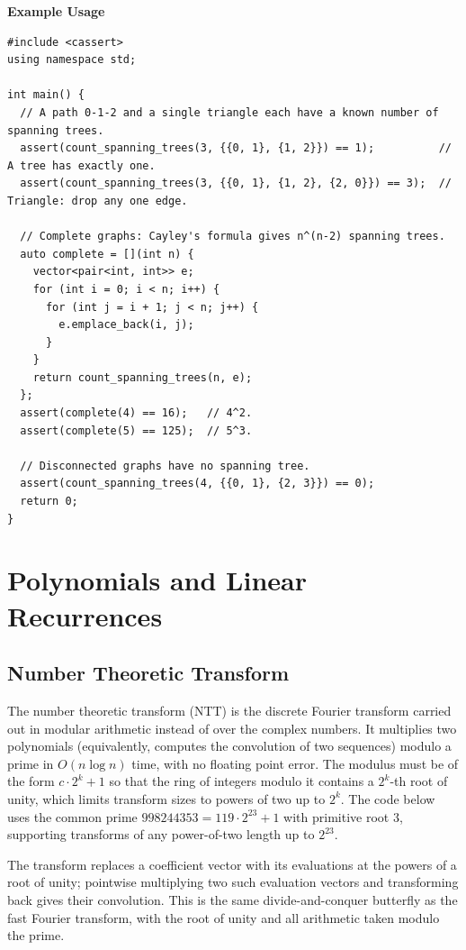 \textbf{Example Usage}\par
\begin{lstlisting}[style=cpp]
#include <cassert>
using namespace std;

int main() {
  // A path 0-1-2 and a single triangle each have a known number of spanning trees.
  assert(count_spanning_trees(3, {{0, 1}, {1, 2}}) == 1);          // A tree has exactly one.
  assert(count_spanning_trees(3, {{0, 1}, {1, 2}, {2, 0}}) == 3);  // Triangle: drop any one edge.

  // Complete graphs: Cayley's formula gives n^(n-2) spanning trees.
  auto complete = [](int n) {
    vector<pair<int, int>> e;
    for (int i = 0; i < n; i++) {
      for (int j = i + 1; j < n; j++) {
        e.emplace_back(i, j);
      }
    }
    return count_spanning_trees(n, e);
  };
  assert(complete(4) == 16);   // 4^2.
  assert(complete(5) == 125);  // 5^3.

  // Disconnected graphs have no spanning tree.
  assert(count_spanning_trees(4, {{0, 1}, {2, 3}}) == 0);
  return 0;
}
\end{lstlisting}

\section{\texorpdfstring{Polynomials and Linear Recurrences}{6.6 Polynomials and Linear Recurrences}}
\setcounter{section}{6}
\setcounter{subsection}{0}
\subsection{Number Theoretic Transform}
\label{sec:6.6.1}
The number theoretic transform (NTT) is the discrete Fourier transform carried out in modular arithmetic instead of over the complex numbers. It multiplies two polynomials (equivalently, computes the convolution of two sequences) modulo a prime in $O(n \log n)$ time, with no floating point error. The modulus must be of the form $c \cdot 2^k + 1$ so that the ring of integers modulo it contains a $2^k$-th root of unity, which limits transform sizes to powers of two up to $2^k$. The code below uses the common prime $998244353 = 119 \cdot 2^{23} + 1$ with primitive root $3$, supporting transforms of any power-of-two length up to $2^{23}$.

The transform replaces a coefficient vector with its evaluations at the powers of a root of unity; pointwise multiplying two such evaluation vectors and transforming back gives their convolution. This is the same divide-and-conquer butterfly as the fast Fourier transform, with the root of unity and all arithmetic taken modulo the prime.

